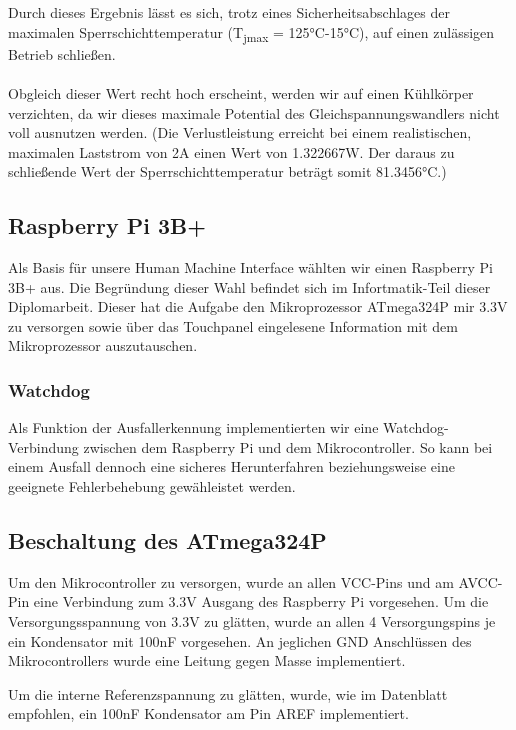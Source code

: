 Durch dieses Ergebnis lässt es sich, trotz eines Sicherheitsabschlages der maximalen Sperrschichttemperatur (T\textsubscript{jmax} = 125°C-15°C), auf einen zulässigen Betrieb schließen.\\\\
Obgleich dieser Wert recht hoch erscheint, werden wir auf einen Kühlkörper verzichten, da wir dieses maximale Potential des Gleichspannungswandlers nicht voll ausnutzen werden.
(Die Verlustleistung erreicht bei einem realistischen, maximalen Laststrom von 2A einen Wert von 1.322667W. Der daraus zu schließende Wert der Sperrschichttemperatur beträgt somit 81.3456°C.)

\subsection{Raspberry Pi 3B+}

Als Basis für unsere Human Machine Interface wählten wir einen Raspberry Pi 3B+ aus.
Die Begründung dieser Wahl befindet sich im Infortmatik-Teil dieser Diplomarbeit.
Dieser hat die Aufgabe den Mikroprozessor ATmega324P mir 3.3V zu versorgen sowie über das Touchpanel eingelesene Information mit dem Mikroprozessor auszutauschen.

\subsubsection{Watchdog}

Als Funktion der Ausfallerkennung implementierten wir eine Watchdog-Verbindung zwischen dem Raspberry Pi und dem Mikrocontroller.
So kann bei einem Ausfall dennoch eine sicheres Herunterfahren beziehungsweise eine geeignete Fehlerbehebung gewähleistet werden.

\subsection{Beschaltung des ATmega324P}

Um den Mikrocontroller zu versorgen, wurde an allen VCC-Pins und am AVCC-Pin eine Verbindung zum 3.3V Ausgang des Raspberry Pi vorgesehen.
Um die Versorgungsspannung von 3.3V zu glätten, wurde an allen 4 Versorgungspins je ein Kondensator mit 100nF vorgesehen.
An jeglichen GND Anschlüssen des Mikrocontrollers wurde eine Leitung gegen Masse implementiert.

Um die interne Referenzspannung zu glätten, wurde, wie im Datenblatt empfohlen, ein 100nF Kondensator am Pin AREF implementiert.

